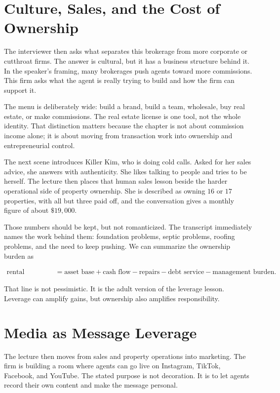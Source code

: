 \section{Culture, Sales, and the Cost of Ownership}

The interviewer then asks what separates this brokerage from more corporate or cutthroat firms. The answer is cultural, but it has a business structure behind it. In the speaker's framing, many brokerages push agents toward more commissions. This firm asks what the agent is really trying to build and how the firm can support it.

The menu is deliberately wide: build a brand, build a team, wholesale, buy real estate, or make commissions. The real estate license is one tool, not the whole identity. That distinction matters because the chapter is not about commission income alone; it is about moving from transaction work into ownership and entrepreneurial control.

The next scene introduces Killer Kim, who is doing cold calls. Asked for her sales advice, she answers with authenticity. She likes talking to people and tries to be herself. The lecture then places that human sales lesson beside the harder operational side of property ownership. She is described as owning \(16\) or \(17\) properties, with all but three paid off, and the conversation gives a monthly figure of about \(\$19{,}000\).

Those numbers should be kept, but not romanticized. The transcript immediately names the work behind them: foundation problems, septic problems, roofing problems, and the need to keep pushing. We can summarize the ownership burden as

\begin{align}
\text{rental ownership}
&=
\text{asset base}
+
\text{cash flow}
-
\text{repairs}
-
\text{debt service}
-
\text{management burden}.
\end{align}

That line is not pessimistic. It is the adult version of the leverage lesson. Leverage can amplify gains, but ownership also amplifies responsibility.

\section{Media as Message Leverage}

The lecture then moves from sales and property operations into marketing. The firm is building a room where agents can go live on Instagram, TikTok, Facebook, and YouTube. The stated purpose is not decoration. It is to let agents record their own content and make the message personal.

